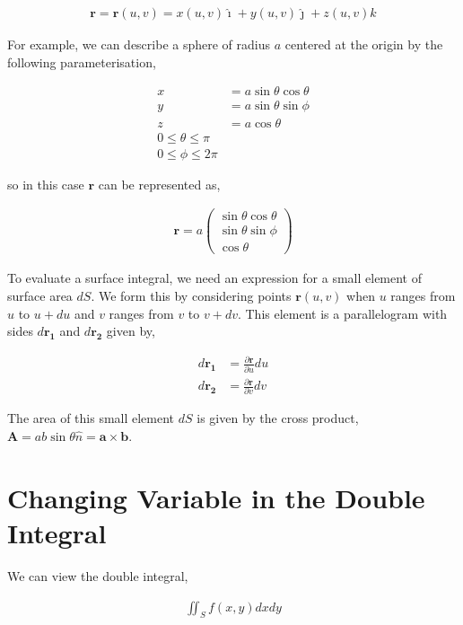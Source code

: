 \documentclass[11pt]{amsart}
\begin{document}
\begin{align*}
  \mathbf{r} = \mathbf{r}(u, v) = x(u, v)\hat{\imath} + y(u, v)\hat{\jmath} + z(u, v)\hat{k}
\end{align*}

For example, we can describe a sphere of radius $a$ centered at the origin by the following parameterisation,

\begin{align*}
  x &= a\sin{\theta}\cos{\theta} \\
  y &= a\sin{\theta}\sin{\phi} \\
  z &= a\cos{\theta} \\
  0 \leq \theta \leq \pi \\
  0 \leq \phi \leq 2\pi
\end{align*}

so in this case $\mathbf{r}$ can be represented as,

\begin{align*}
  \mathbf{r} = a
  \begin{pmatrix}
    \sin{\theta}\cos{\theta} \\
    \sin{\theta}\sin{\phi} \\
    \cos{\theta}
  \end{pmatrix}
\end{align*}

To evaluate a surface integral, we need an expression for a small element of surface area $dS$. We form this by considering points $\mathbf{r}(u, v)$ when $u$ ranges from $u$ to $u + du$ and $v$ ranges from $v$ to $v + dv$. This element is a parallelogram with sides $d\mathbf{r_1}$ and $d\mathbf{r_2}$ given by,

\begin{align*}
  d\mathbf{r_1} &= \frac{\partial \mathbf{r}}{\partial u} du \\
  d\mathbf{r_2} &= \frac{\partial \mathbf{r}}{\partial v} dv
\end{align*}

The area of this small element $dS$ is given by the cross product, $\mathbf{A} = ab\sin{\theta}\hat{n} = \mathbf{a} \times \mathbf{b}$.

\section{Changing Variable in the Double Integral}

We can view the double integral,

\begin{align*}
  \iint_S f(x, y) dx dy
\end{align*}
\end{document}
